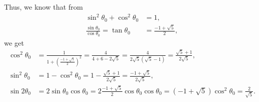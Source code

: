 \documentclass[a4paper]{book}
\newcounter{solution}[chapter]
\begin{document}
\begin{solution}
\begin{itemize}
	Thus, we know that from
	\begin{align*}
		\sin^2 \theta_0 + \cos^2 \theta_0 &= 1 , \\
		\frac{ \sin \theta_0 }{ \cos \theta_0 } = \tan \theta_0 &= \frac{ -1 + \sqrt{5} }{2},
	\end{align*}
	we get
	\begin{align*}
		\cos^2 \theta_0 &= \frac{1}{ 1 + \left( \frac{ -1 + \sqrt{5} }{2} \right)^2 } = \frac{ 4 }{ 4 + 6 - 2\sqrt{5} } = \frac{ 4 }{ 2\sqrt{5} ( \sqrt{5} - 1 ) } = \frac{ \sqrt{5} + 1 }{ 2\sqrt{5} } , \\
		\sin^2 \theta_0 &= 1 - \cos^2 \theta_0 = 1 - \frac{ \sqrt{5} + 1 }{ 2\sqrt{5} } = \frac{ -1 + \sqrt{5} }{ 2\sqrt{5} } , \\
		\sin 2\theta_0 &= 2 \sin \theta_0 \cos \theta_0 = 2 \frac{ -1 + \sqrt{5} }{ 2 } \cos \theta_0 \cos \theta_0 = ( -1 + \sqrt{5} ) \cos^2 \theta_0 = \frac{ 2 }{ \sqrt{5} } .
	\end{align*}
	

\end{itemize}
\end{solution}
\end{document}
